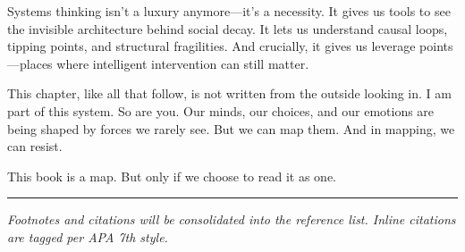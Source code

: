 Systems thinking isn't a luxury anymore---it's a necessity. It gives us
tools to see the invisible architecture behind social decay. It lets us
understand causal loops, tipping points, and structural fragilities. And
crucially, it gives us leverage points---places where intelligent
intervention can still matter.

This chapter, like all that follow, is not written from the outside
looking in. I am part of this system. So are you. Our minds, our
choices, and our emotions are being shaped by forces we rarely see. But
we can map them. And in mapping, we can resist.

This book is a map. But only if we choose to read it as one.

\begin{center}\rule{0.5\linewidth}{0.5pt}\end{center}

\emph{Footnotes and citations will be consolidated into the reference
list. Inline citations are tagged per APA 7th style.}
